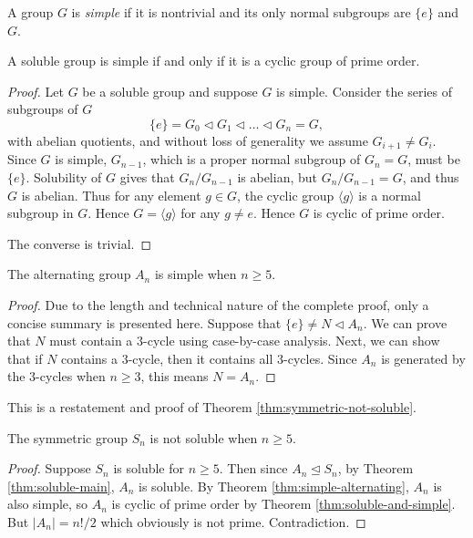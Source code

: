 \begin{definition}
	A group $G$ is \textit{simple} if it is nontrivial and its only normal subgroups are $\{ e \}$ and $G$. 
\end{definition}

\begin{theorem} \label{thm:soluble-and-simple}
	A soluble group is simple if and only if it is a cyclic group of prime order.
\end{theorem}

\begin{proof}
	Let $G$ be a soluble group and suppose $G$ is simple. Consider the series of subgroups of $G$
	$$
	\{ e \}=G_0 \triangleleft G_1 \triangleleft \ldots \triangleleft G_n=G,
	$$
	with abelian quotients, and without loss of generality we assume $G_{i+1} \neq G_i$. Since $G$ is simple, $G_{n-1}$, which is a proper normal subgroup of $G_n = G$, must be $\{ e \}$. Solubility of $G$ gives that $G_n / G_{n -1 }$ is abelian, but $G_n / G_{n - 1} = G$, and thus $G$ is abelian. Thus for any element $g \in G$, the cyclic group $\langle g\rangle$ is a normal subgroup in $G$. Hence  $G = \langle g\rangle$ for any $g \neq e$. Hence $G$ is cyclic of prime order.
	
	The converse is trivial.
\end{proof}


\begin{theorem} \label{thm:simple-alternating}
	The alternating group $A_n$ is simple when $n \ge 5$. 
\end{theorem}

\begin{proof}
    Due to the length and technical nature of the complete proof, only a concise summary is presented here. 
	Suppose that $\{ e \} \neq N \triangleleft A_n$. We can prove that $N$ must contain a $3$-cycle using case-by-case analysis. Next, we can show that if $N$ contains a $3$-cycle, then it contains all $3$-cycles. Since $A_n$ is generated by the $3$-cycles when $n \ge 3$, this means $N = A_n$.
\end{proof}

This is a restatement and proof of Theorem \ref{thm:symmetric-not-soluble}. 

\begin{theorem} \label{thm:symmetric-not-soluble-appendix}
	The symmetric group $S_n$ is not soluble when $n \ge 5$. 
\end{theorem}

\begin{proof}
	Suppose $S_n$ is soluble for $n \ge 5$. Then since $A_n \trianglelefteq S_n$, by Theorem \ref{thm:soluble-main}, $A_n$ is soluble. By Theorem \ref{thm:simple-alternating}, $A_n$ is also simple, so $A_n$ is cyclic of prime order by Theorem \ref{thm:soluble-and-simple}. But $|A_n| = n! / 2$ which obviously is not prime. Contradiction.
\end{proof}


